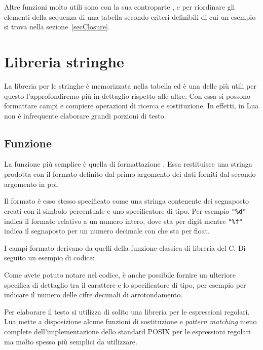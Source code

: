 Altre funzioni molto utili sono  con la
sua controparte , e
 per riordinare gli elementi della sequenza di
una tabella secondo criteri definibili di cui un esempio si trova nella
sezione~\ref{secClosure}.


\section{Libreria stringhe}

La libreria per le stringhe è memorizzata nella tabella  ed è una
delle più utili per questo l'approfondiremo più in dettaglio rispetto alle
altre. Con essa si possono formattare campi e compiere operazioni di ricerca e
sostituzione. In effetti, in Lua non è infrequente elaborare grandi porzioni di
testo.


\subsection{Funzione }
\label{secFondStringFormat}

La funzione più semplice è quella di formattazione
. Essa restituisce una stringa prodotta
con il formato definito dal primo argomento dei dati forniti dal secondo
argomento in poi.

Il formato è esso stesso specificato come una stringa contenente dei segnaposto
creati con il simbolo percentuale e uno specificatore di tipo. Per esempio
\verb|"%d"| indica il formato relativo a un numero intero, dove  sta per
digit mentre \verb|"%f"| indica il segnaposto per un numero decimale con 
che sta per float.

I campi formato derivano da quelli della funzione classica di libreria
 del C. Di seguito un esempio di codice:

Come avete potuto notare nel codice, è anche possibile fornire un ulteriore
specifica di dettaglio tra il carattere \key{\%} e lo specificatore di tipo, per
esempio per indicare il numero delle cifre decimali di arrotondamento.

Per elaborare il testo si utilizza di solito una libreria per le espressioni
regolari. Lua mette a disposizione alcune funzioni di sostituzione e
\emph{pattern matching} meno complete dell'implementazione dello standard
POSIX per le espressioni regolari ma molto spesso più semplici da utilizzare.

